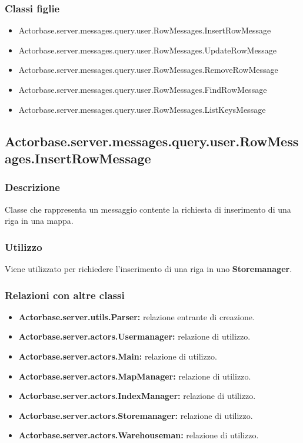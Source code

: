 \documentclass[a4paper]{article}
\begin{document}
			\subsubsection{Classi figlie}
				\begin{itemize}
					\item Actorbase.server.messages.query.user.RowMessages.InsertRowMessage
					\item Actorbase.server.messages.query.user.RowMessages.UpdateRowMessage
					\item Actorbase.server.messages.query.user.RowMessages.RemoveRowMessage
					\item Actorbase.server.messages.query.user.RowMessages.FindRowMessage
					\item Actorbase.server.messages.query.user.RowMessages.ListKeysMessage
				\end{itemize}
		
		\subsection{Actorbase.server.messages.query.user.RowMessages.InsertRowMessage}
			\subsubsection{Descrizione}
				Classe che rappresenta un messaggio contente la richiesta di inserimento di una riga in una mappa.
				
			\subsubsection{Utilizzo}
				Viene utilizzato per richiedere l'inserimento di una riga in uno \textbf{Storemanager}.
				
			\subsubsection{Relazioni con altre classi}
				\begin{itemize}
					\item \textbf{Actorbase.server.utils.Parser:} relazione entrante di creazione.
					\item \textbf{Actorbase.server.actors.Usermanager:} relazione di utilizzo.
					\item \textbf{Actorbase.server.actors.Main:} relazione di utilizzo.
					\item \textbf{Actorbase.server.actors.MapManager:} relazione di utilizzo.
					\item \textbf{Actorbase.server.actors.IndexManager:} relazione di utilizzo.
					\item \textbf{Actorbase.server.actors.Storemanager:} relazione di utilizzo.
					\item \textbf{Actorbase.server.actors.Warehouseman:} relazione di utilizzo.
				\end{itemize}
\end{document}
